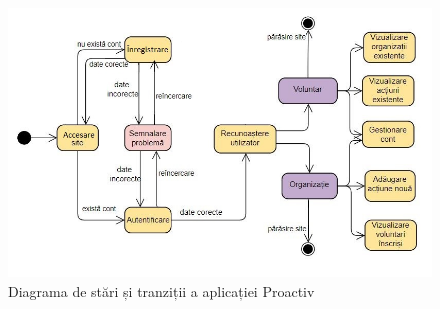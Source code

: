 \documentclass[12pt,a4paper]{report}
\begin{document}
\begin{figure}[h!]
\centering
  \includegraphics[width=0.9\linewidth]{./imagini/stateMachine.JPG}
  \caption{Diagrama de stări și tranziții a aplicației Proactiv}
\end{figure}

\newpage
\end{document}
